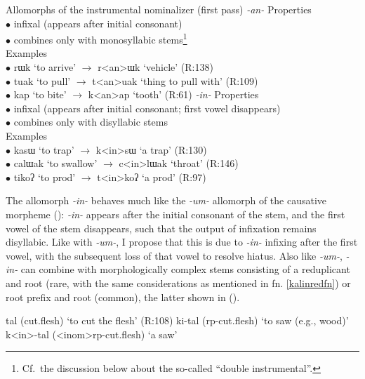 \documentclass[output=paper]{langscibook}
\newcounter{nexttmp}    %
\newcommand{\Next}{\setcounter{nexttmp}{\value{equation}}\stepcounter{nexttmp}(\thenexttmp)\xspace}
\begin{document}
\ea Allomorphs of the instrumental nominalizer (first pass) \label{kalininstallos}
\ea \textit{-an-} \label{kalininstallosb}
\ea Properties\\
$\bullet$ infixal (appears after initial consonant)\\
$\bullet$ combines only with monosyllabic stems\footnote{Cf.\ the discussion below about the so-called ``double instrumental''.}\\
\ex Examples\\
$\bullet$ rɯk `to arrive' $\rightarrow$ r<an>ɯk `vehicle' \hfill (R:138)\\
$\bullet$ tuak `to pull' $\rightarrow$ t<an>uak `thing to pull with' \hfill (R:109)\\
$\bullet$ kap `to bite' $\rightarrow$ k<an>ap `tooth' \hfill (R:61)
\z
\ex \textit{-in-} \label{kalininstallosa}
\ea  Properties\\
$\bullet$ infixal (appears after initial consonant; first vowel disappears)\\
$\bullet$ combines only with disyllabic stems\\
\ex Examples\\
$\bullet$ kasɯ `to trap' $\rightarrow$ k<in>sɯ `a trap' \hfill (R:130)\\
$\bullet$ calɯak `to swallow' $\rightarrow$ c<in>lɯak `throat' \hfill (R:146)\\
$\bullet$ tikoʔ `to prod' $\rightarrow$ t<in>koʔ `a prod' \hfill (R:97)
\z
\z
\z

The allomorph \textit{-in-} behaves much like the \textit{-um-} allomorph of the causative morpheme (): \textit{-in-} appears after the initial consonant of the stem, and the first vowel of the stem disappears, such that the output of infixation remains disyllabic. Like with \textit{-um-}, I propose that this is due to \textit{-in-} infixing after the first vowel, with the subsequent loss of that vowel to resolve hiatus. Also like  \textit{-um-},  \textit{-in-} can combine with morphologically complex stems consisting of a reduplicant and root (rare, with the same considerations as mentioned in fn. \ref{kalinredfn}) or root prefix and root (common), the latter shown in \Next.

\ea
\ea tal (cut.flesh) \hfill `to cut the flesh' (R:108)
\ex ki-tal ({\sc rp-}cut.flesh) \hfill `to saw (e.g., wood)' 
\ex k<in>-tal ({\sc <inom>rp-}cut.flesh) \hfill `a saw' \label{kalinrpinstc}
\z
\z
\end{document}

